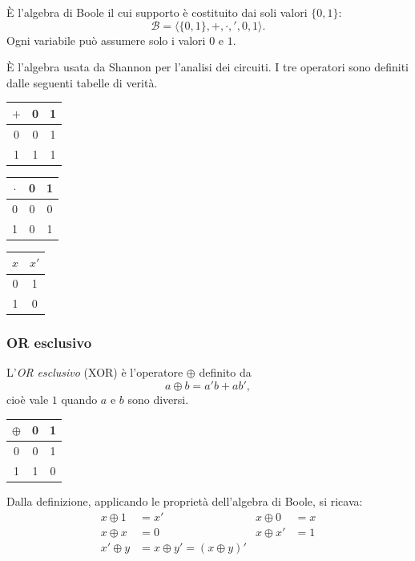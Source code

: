 \documentclass[11pt,a4paper]{article}
\begin{document}
\begin{definizione}
È l'algebra di Boole il cui supporto è costituito dai soli valori $\{0, 1\}$:
\[
  \mathcal{B} = \langle \{0,1\}, +, \cdot, ', 0, 1 \rangle .
\]
Ogni variabile può assumere solo i valori $0$ e $1$.
\end{definizione}

È l'algebra usata da Shannon per l'analisi dei circuiti. I tre operatori sono
definiti dalle seguenti tabelle di verità.

\begin{center}
\begin{tabular}{c|cc}
$+$ & 0 & 1 \\ \midrule
0 & 0 & 1 \\
1 & 1 & 1
\end{tabular}
\qquad\qquad
\begin{tabular}{c|cc}
$\cdot$ & 0 & 1 \\ \midrule
0 & 0 & 0 \\
1 & 0 & 1
\end{tabular}
\qquad\qquad
\begin{tabular}{c|c}
$x$ & $x'$ \\ \midrule
0 & 1 \\
1 & 0
\end{tabular}
\end{center}

\subsubsection{OR esclusivo}

L'\emph{OR esclusivo} (XOR) è l'operatore $\oplus$ definito da
\[
  a \oplus b = a' b + a b' ,
\]
cioè vale $1$ quando $a$ e $b$ sono diversi.

\begin{center}
\begin{tabular}{c|cc}
$\oplus$ & 0 & 1 \\ \midrule
0 & 0 & 1 \\
1 & 1 & 0
\end{tabular}
\end{center}

Dalla definizione, applicando le proprietà dell'algebra di Boole, si ricava:
\begin{align}
x \oplus 1 &= x' & x \oplus 0 &= x \\
x \oplus x &= 0 & x \oplus x' &= 1 \\
x' \oplus y &= x \oplus y' = (x \oplus y)'
\end{align}
\end{document}
